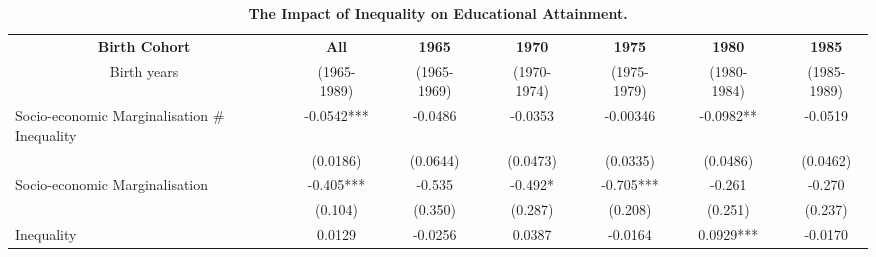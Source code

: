 \documentclass[a4paper, 12pt]{article}
\begin{document}
\begin{table}[htbp]
  \centering
\caption{\textbf{The Impact of Inequality on Educational Attainment.}}
\vspace*{-2mm}
  \begin{adjustbox}{max width=\textwidth}
    \begin{tabular}{lllllllllllll}
    \toprule
    \multicolumn{1}{c}{\textbf{Birth Cohort}} &       & \multicolumn{1}{c}{\textbf{All}} &       & \multicolumn{1}{c}{\textbf{1965}} &       & \multicolumn{1}{c}{\textbf{1970}} &       & \multicolumn{1}{c}{\textbf{1975}} &       & \multicolumn{1}{c}{\textbf{1980}} &       & \multicolumn{1}{c}{\textbf{1985}} \\
    \multicolumn{1}{c}{Birth years} &       & \multicolumn{1}{c}{(1965-1989)} &       & \multicolumn{1}{c}{(1965-1969)} &       & \multicolumn{1}{c}{(1970-1974)} &       & \multicolumn{1}{c}{(1975-1979)} &       & \multicolumn{1}{c}{(1980-1984)} &       & \multicolumn{1}{c}{(1985-1989)} \\
\cmidrule{3-3}\cmidrule{5-5}\cmidrule{7-7}\cmidrule{9-9}\cmidrule{11-11}\cmidrule{13-13}    Socio-economic Marginalisation \# Inequality &       & \multicolumn{1}{c}{-0.0542***} &       & \multicolumn{1}{c}{-0.0486} &       & \multicolumn{1}{c}{-0.0353} &       & \multicolumn{1}{c}{-0.00346} &       & \multicolumn{1}{c}{-0.0982**} &       & \multicolumn{1}{c}{-0.0519} \\
          &       & \multicolumn{1}{c}{(0.0186)} &       & \multicolumn{1}{c}{(0.0644)} &       & \multicolumn{1}{c}{(0.0473)} &       & \multicolumn{1}{c}{(0.0335)} &       & \multicolumn{1}{c}{(0.0486)} &       & \multicolumn{1}{c}{(0.0462)} \\
    Socio-economic Marginalisation &       & \multicolumn{1}{c}{-0.405***} &       & \multicolumn{1}{c}{-0.535} &       & \multicolumn{1}{c}{-0.492*} &       & \multicolumn{1}{c}{-0.705***} &       & \multicolumn{1}{c}{-0.261} &       & \multicolumn{1}{c}{-0.270} \\
          &       & \multicolumn{1}{c}{(0.104)} &       & \multicolumn{1}{c}{(0.350)} &       & \multicolumn{1}{c}{(0.287)} &       & \multicolumn{1}{c}{(0.208)} &       & \multicolumn{1}{c}{(0.251)} &       & \multicolumn{1}{c}{(0.237)} \\
    Inequality &       & \multicolumn{1}{c}{0.0129} &       & \multicolumn{1}{c}{-0.0256} &       & \multicolumn{1}{c}{0.0387} &       & \multicolumn{1}{c}{-0.0164} &       & \multicolumn{1}{c}{0.0929***} &       & \multicolumn{1}{c}{-0.0170} \\

\end{tabular}
\end{adjustbox}
\end{table}
\end{document}
